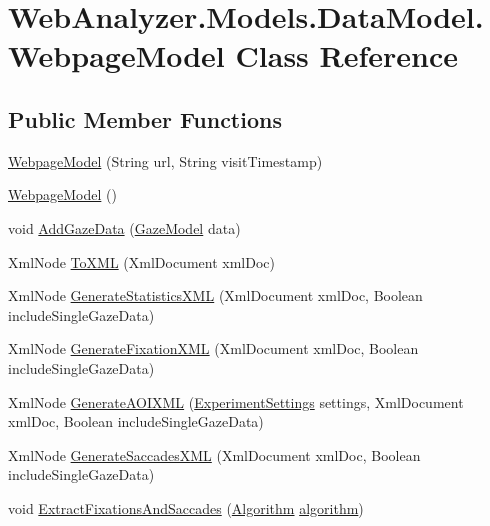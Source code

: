 \hypertarget{class_web_analyzer_1_1_models_1_1_data_model_1_1_webpage_model}{}\section{Web\+Analyzer.\+Models.\+Data\+Model.\+Webpage\+Model Class Reference}
\label{class_web_analyzer_1_1_models_1_1_data_model_1_1_webpage_model}
\subsection*{Public Member Functions}
\begin{DoxyCompactItemize}
\item 
\hyperlink{class_web_analyzer_1_1_models_1_1_data_model_1_1_webpage_model_ae5054b6875654937144914f592802d9d}{Webpage\+Model} (String url, String visit\+Timestamp)
\item 
\hyperlink{class_web_analyzer_1_1_models_1_1_data_model_1_1_webpage_model_a613cfd755d739701df6cd2b05190d72f}{Webpage\+Model} ()
\item 
void \hyperlink{class_web_analyzer_1_1_models_1_1_data_model_1_1_webpage_model_a7169078e11bdd8867dc0f507c9a65b9e}{Add\+Gaze\+Data} (\hyperlink{class_web_analyzer_1_1_models_1_1_data_model_1_1_gaze_model}{Gaze\+Model} data)
\item 
Xml\+Node \hyperlink{class_web_analyzer_1_1_models_1_1_data_model_1_1_webpage_model_a056bc9895b2a1c83631c24d100353ef2}{To\+X\+M\+L} (Xml\+Document xml\+Doc)
\item 
Xml\+Node \hyperlink{class_web_analyzer_1_1_models_1_1_data_model_1_1_webpage_model_a32f7e53626e6dcec7a2261110456dde1}{Generate\+Statistics\+X\+M\+L} (Xml\+Document xml\+Doc, Boolean include\+Single\+Gaze\+Data)
\item 
Xml\+Node \hyperlink{class_web_analyzer_1_1_models_1_1_data_model_1_1_webpage_model_a52e59f18909452181341e36e18bb57fb}{Generate\+Fixation\+X\+M\+L} (Xml\+Document xml\+Doc, Boolean include\+Single\+Gaze\+Data)
\item 
Xml\+Node \hyperlink{class_web_analyzer_1_1_models_1_1_data_model_1_1_webpage_model_ac77dcced8299e84a47feea280c9e9dee}{Generate\+A\+O\+I\+X\+M\+L} (\hyperlink{class_web_analyzer_1_1_models_1_1_settings_model_1_1_experiment_settings}{Experiment\+Settings} settings, Xml\+Document xml\+Doc, Boolean include\+Single\+Gaze\+Data)
\item 
Xml\+Node \hyperlink{class_web_analyzer_1_1_models_1_1_data_model_1_1_webpage_model_a123917bf5e44e719fb0e626615f030ab}{Generate\+Saccades\+X\+M\+L} (Xml\+Document xml\+Doc, Boolean include\+Single\+Gaze\+Data)
\item 
void \hyperlink{class_web_analyzer_1_1_models_1_1_data_model_1_1_webpage_model_aebdfec61a00dd14845ee5e46bccbf268}{Extract\+Fixations\+And\+Saccades} (\hyperlink{class_web_analyzer_1_1_models_1_1_algorithm_model_1_1_algorithm}{Algorithm} \hyperlink{_u_i_2_h_t_m_l_resources_2js_2src_2analyse_8js_a1222cf9678e9ad6a699b071d3308f976}{algorithm})
\end{DoxyCompactItemize}
